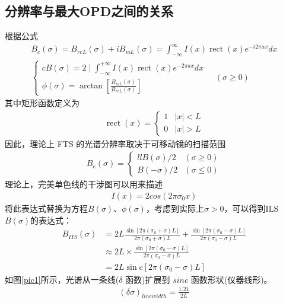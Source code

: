 \documentclass[conference]{IEEEtran}
\begin{document}
\subsection{分辨率与最大OPD之间的关系}
根据公式
\begin{align}
    B_{c}(\sigma)=B_{r e L}(\sigma)+i B_{i o L}(\sigma)=\int_{-\infty}^{\infty} I(x) \operatorname{rect}(x) e^{-i 2 \pi a x} d x \\
    \begin{cases}{c}
        B(\sigma)=2 \mid \int_{-\infty}^{+\infty} I(x) \operatorname{rect}(x) e^{-2 \pi a x} d x \\
        \phi(\sigma)=\arctan \left[\frac{B_{i o L}(\sigma)}{B_{r e L}(\sigma)}\right]
    \end{cases} \quad(\sigma \geq 0)
\end{align}
其中矩形函数定义为
\begin{align*}
    \operatorname{rect}(x)=\begin{cases}
        1 & |x|<L \\
        0 & |x|>L
        \end{cases}
\end{align*}
因此，理论上 FTS 的光谱分辨率取决于可移动镜的扫描范围
\begin{align}
    B_{e}(\sigma)=\begin{cases}{ll}
        B(\sigma) / 2 & (\sigma \geq 0) \\
        B(-\sigma) / 2 & (\sigma \leq 0)
        \end{cases}
\end{align}
理论上，完美单色线的干涉图可以用来描述
\begin{align}
    I(x) = 2cos(2\pi \sigma_0 x)
\end{align}
将此表达式替换为方程$B(\sigma)$、$\phi(\sigma)$，考虑到实际上$\sigma > 0$，可以得到ILS $B(\sigma)$的表达式：
\begin{align}
        B_{I I S}(\sigma)
        &=2 L\frac{\sin \left[2 \pi\left(\sigma_{0}+\sigma\right) L\right]}{2 \pi\left(\sigma_{0}+\sigma\right) L}+\frac{\sin \left[2 \pi\left(\sigma_{0}-\sigma\right) L\right]}{2 \pi\left(\sigma_{0}-\sigma\right) L} \\
        & \approx 2 L \times \frac{\sin \left[2 \pi\left(\sigma_{0}-\sigma\right) L\right]}{2 \pi\left(\sigma_{0}-\sigma\right) L}  \\
        & =2 L \sin c\left[2 \pi\left(\sigma_{0}-\sigma\right) L\right]
\end{align}
如图\ref{pic1}所示，光谱从一条线($\delta$ 函数)扩展到 $sin c$ 函数形状(仪器线形)。
\begin{align}
    (\delta \sigma)_{linewidth} = \frac{1.21}{2L}
\end{align}
\end{document}
